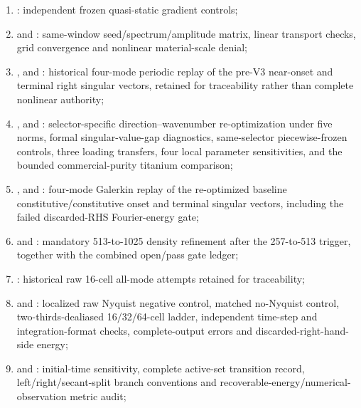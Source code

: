 \begin{enumerate}
\item {}: independent frozen quasi-static gradient controls;
\item {} and : same-window seed/spectrum/amplitude matrix, linear transport checks, grid convergence and nonlinear material-scale denial;
\item {},  and : historical four-mode periodic replay of the pre-V3 near-onset and terminal right singular vectors, retained for traceability rather than complete nonlinear authority;
\item {},  and : selector-specific direction--wavenumber re-optimization under five norms, formal singular-value-gap diagnostics, same-selector piecewise-frozen controls, three loading transfers, four local parameter sensitivities, and the bounded commercial-purity titanium comparison;
\item {},  and : four-mode Galerkin replay of the re-optimized baseline constitutive/constitutive onset and terminal singular vectors, including the failed discarded-RHS Fourier-energy gate;
\item {} and : mandatory 513-to-1025 density refinement after the 257-to-513 trigger, together with the combined open/pass gate ledger;
\item {}: historical raw 16-cell all-mode attempts retained for traceability;
\item {} and : localized raw Nyquist negative control, matched no-Nyquist control, two-thirds-dealiased 16/32/64-cell ladder, independent time-step and integration-format checks, complete-output errors and discarded-right-hand-side energy;
\item {} and : initial-time sensitivity, complete active-set transition record, left/right/secant-split branch conventions and recoverable-energy/numerical-observation metric audit;

\end{enumerate}
